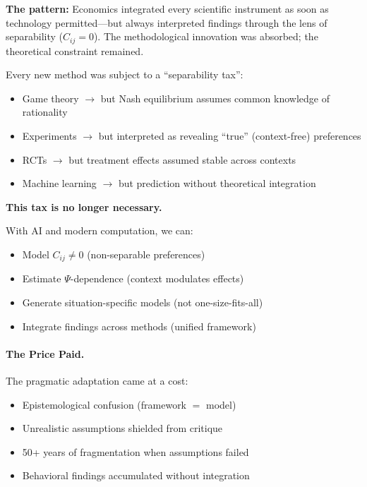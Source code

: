 \textbf{The pattern:} Economics integrated every scientific instrument as soon
as technology permitted---but always interpreted findings through the lens
of separability ($C_{ij} = 0$). The methodological innovation was absorbed;
the theoretical constraint remained.

\begin{tcolorbox}[colback=yellow!5!white, colframe=yellow!75!black,
    title=\textbf{The Separability Tax}]

Every new method was subject to a ``separability tax'':
\begin{itemize}[nosep]
    \item Game theory $\to$ but Nash equilibrium assumes common knowledge of rationality
    \item Experiments $\to$ but interpreted as revealing ``true'' (context-free) preferences
    \item RCTs $\to$ but treatment effects assumed stable across contexts
    \item Machine learning $\to$ but prediction without theoretical integration
\end{itemize}

\textbf{This tax is no longer necessary.}

With AI and modern computation, we can:
\begin{itemize}[nosep]
    \item Model $C_{ij} \neq 0$ (non-separable preferences)
    \item Estimate $\Psi$-dependence (context modulates effects)
    \item Generate situation-specific models (not one-size-fits-all)
    \item Integrate findings across methods (unified framework)
\end{itemize}
\end{tcolorbox}

\paragraph{The Price Paid.}

The pragmatic adaptation came at a cost:
\begin{itemize}[nosep]
    \item Epistemological confusion (framework $=$ model)
    \item Unrealistic assumptions shielded from critique
    \item 50+ years of fragmentation when assumptions failed
    \item Behavioral findings accumulated without integration
\end{itemize}

